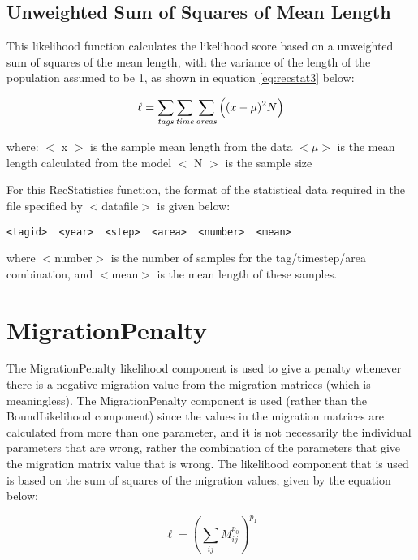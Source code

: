\documentclass[]{book}
\begin{document}
\hypertarget{unweighted-sum-of-squares-of-mean-length-1}{%
\subsection{Unweighted Sum of Squares of Mean Length}\label{unweighted-sum-of-squares-of-mean-length-1}}

This likelihood function calculates the likelihood score based on a
unweighted sum of squares of the mean length, with the variance of the
length of the population assumed to be 1, as shown in
equation \eqref{eq:recstat3} below:

\begin{equation}
\label{eq:recstat3}
\ell = \sum_{\it tags}\sum_{\it time}\sum_{\it areas} \Big((x-\mu)^2 N\Big)\end{equation}

where: \(<\) x \(>\) is the sample mean length from the data \(<\mu>\) is the
mean length calculated from the model \(<\) N \(>\) is the sample size

For this RecStatistics function, the format of the statistical data
required in the file specified by \(<\)datafile\(>\) is given below:

\begin{verbatim}
<tagid>  <year>  <step>  <area>  <number>  <mean>
\end{verbatim}

where \(<\)number\(>\) is the number of samples for the tag/timestep/area
combination, and \(<\)mean\(>\) is the mean length of these samples.

\hypertarget{sec:migpenalty}{%
\section{MigrationPenalty}\label{sec:migpenalty}}

The MigrationPenalty likelihood component is used to give a penalty
whenever there is a negative migration value from the migration matrices
(which is meaningless). The MigrationPenalty component is used (rather
than the BoundLikelihood component) since the values in the migration
matrices are calculated from more than one parameter, and it is not
necessarily the individual parameters that are wrong, rather the
combination of the parameters that give the migration matrix value that
is wrong. The likelihood component that is used is based on the sum of
squares of the migration values, given by the equation below:

\begin{equation}
\label{eq:migpenalty}
\ell = \left( \sum_{ij}^{} M_{ij}^{p_0} \right)^{p_1}\end{equation}
\end{document}

